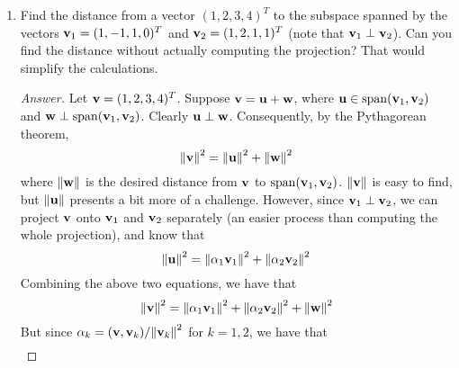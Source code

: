 \documentclass[../psets.tex]{subfiles}
\begin{document}
\begin{enumerate}[label={\textbf{3.\arabic*.}}]
\begin{proof}[Answer]
\begin{align*}
            \begin{pmatrix}
                2\\
                -1\\
                1\\
                0\\
            \end{pmatrix}\\
            &= \frac{1}{6}
            \begin{pmatrix}
                7\\
                7\\
                5\\
                3\\
            \end{pmatrix}
        \end{align*}
        \endgroup
    \end{proof}
    \item Find the distance from a vector $(1,2,3,4)^T$ to the subspace spanned by the vectors $\mathbf{v}_1=(1,-1,1,0)^T$ and $\mathbf{v}_2=(1,2,1,1)^T$ (note that $\mathbf{v}_1\perp\mathbf{v}_2$). Can you find the distance without actually computing the projection? That would simplify the calculations.
    \begin{proof}[Answer]
        Let $\mathbf{v}=(1,2,3,4)^T$. Suppose $\mathbf{v}=\mathbf{u}+\mathbf{w}$, where $\mathbf{u}\in\operatorname{span}(\mathbf{v}_1,\mathbf{v}_2)$ and $\mathbf{w}\perp\operatorname{span}(\mathbf{v}_1,\mathbf{v}_2)$. Clearly $\mathbf{u}\perp\mathbf{w}$. Consequently, by the Pythagorean theorem,
        \begin{equation*}
            \norm{\mathbf{v}}^2 = \norm{\mathbf{u}}^2+\norm{\mathbf{w}}^2
        \end{equation*}
        where $\norm{\mathbf{w}}$ is the desired distance from $\mathbf{v}$ to $\operatorname{span}(\mathbf{v}_1,\mathbf{v}_2)$. $\norm{\mathbf{v}}$ is easy to find, but $\norm{\mathbf{u}}$ presents a bit more of a challenge. However, since $\mathbf{v}_1\perp\mathbf{v}_2$, we can project $\mathbf{v}$ onto $\mathbf{v}_1$ and $\mathbf{v}_2$ separately (an easier process than computing the whole projection), and know that
        \begin{equation*}
            \norm{\mathbf{u}}^2 = \norm{\alpha_1\mathbf{v}_1}^2+\norm{\alpha_2\mathbf{v}_2}^2
        \end{equation*}
        Combining the above two equations, we have that
        \begin{equation*}
            \norm{\mathbf{v}}^2 = \norm{\alpha_1\mathbf{v}_1}^2+\norm{\alpha_2\mathbf{v}_2}^2+\norm{\mathbf{w}}^2
        \end{equation*}
        But since $\alpha_k=(\mathbf{v},\mathbf{v}_k)/\norm{\mathbf{v}_k}^2$ for $k=1,2$, we have that
        \begin{align*}

\end{align*}
\end{proof}
\end{enumerate}
\end{document}
